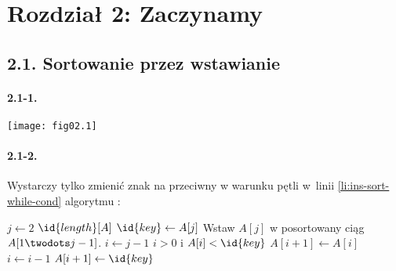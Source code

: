 \section*{Rozdział 2: Zaczynamy}

\subsection*{2.1. Sortowanie przez wstawianie}

\paragraph{2.1-1.}
	\begin{center}
		\texttt{[image: fig02.1]}
	\end{center}

\paragraph{2.1-2.}
Wystarczy tylko zmienić znak na przeciwny w warunku pętli  w~linii \ref{li:ins-sort-while-cond} algorytmu :
\begin{codebox}
\li \For $j\gets 2$ \To $\id{length}[A]$
\li     \Do
            $\id{key}\gets A[j]$
\li         \Comment Wstaw $A[j]$ w posortowany ciąg $A[1\twodots j-1]$.
\li         $i\gets j-1$
\li         \While $i>0$ i $A[i]<\id{key}$ \label{li:ins-sort-while-cond}
\li             \Do
                    $A[i+1]\gets A[i]$
\li                 $i\gets i-1$
                \End
\li         $A[i+1]\gets \id{key}$
        \End
\end{codebox}

